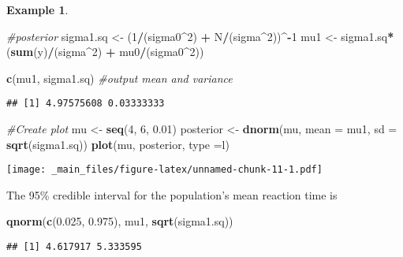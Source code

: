 \documentclass[
]{book}
\newenvironment{Shaded}{\begin{snugshade}}{\end{snugshade}}
\newcommand{\AttributeTok}[1]{\textcolor[rgb]{0.13,0.29,0.53}{#1}}
\newcommand{\CommentTok}[1]{\textcolor[rgb]{0.56,0.35,0.01}{\textit{#1}}}
\newcommand{\DecValTok}[1]{\textcolor[rgb]{0.00,0.00,0.81}{#1}}
\newcommand{\FloatTok}[1]{\textcolor[rgb]{0.00,0.00,0.81}{#1}}
\newcommand{\FunctionTok}[1]{\textcolor[rgb]{0.13,0.29,0.53}{\textbf{#1}}}
\newcommand{\NormalTok}[1]{#1}
\newcommand{\OtherTok}[1]{\textcolor[rgb]{0.56,0.35,0.01}{#1}}
\newcommand{\SpecialCharTok}[1]{\textcolor[rgb]{0.81,0.36,0.00}{\textbf{#1}}}
\newcommand{\StringTok}[1]{\textcolor[rgb]{0.31,0.60,0.02}{#1}}
\theoremstyle{definition}
\theoremstyle{definition}
\newtheorem{example}{Example}[chapter]
\theoremstyle{definition}
\theoremstyle{definition}
\theoremstyle{remark}
\begin{document}
\begin{example}
\begin{Shaded}
\begin{Highlighting}[]
\CommentTok{\#posterior}
\NormalTok{sigma1.sq }\OtherTok{\textless{}{-}}\NormalTok{ (}\DecValTok{1}\SpecialCharTok{/}\NormalTok{(sigma0}\SpecialCharTok{\^{}}\DecValTok{2}\NormalTok{)  }\SpecialCharTok{+}\NormalTok{ N}\SpecialCharTok{/}\NormalTok{(sigma}\SpecialCharTok{\^{}}\DecValTok{2}\NormalTok{))}\SpecialCharTok{\^{}{-}}\DecValTok{1}
\NormalTok{mu1       }\OtherTok{\textless{}{-}}\NormalTok{ sigma1.sq}\SpecialCharTok{*}\NormalTok{(}\FunctionTok{sum}\NormalTok{(y)}\SpecialCharTok{/}\NormalTok{(sigma}\SpecialCharTok{\^{}}\DecValTok{2}\NormalTok{) }\SpecialCharTok{+}\NormalTok{ mu0}\SpecialCharTok{/}\NormalTok{(sigma0}\SpecialCharTok{\^{}}\DecValTok{2}\NormalTok{))}

\FunctionTok{c}\NormalTok{(mu1, sigma1.sq) }\CommentTok{\#output mean and variance}
\end{Highlighting}
\end{Shaded}

\begin{verbatim}
## [1] 4.97575608 0.03333333
\end{verbatim}

\begin{Shaded}
\begin{Highlighting}[]
\CommentTok{\#Create plot}
\NormalTok{mu }\OtherTok{\textless{}{-}} \FunctionTok{seq}\NormalTok{(}\DecValTok{4}\NormalTok{, }\DecValTok{6}\NormalTok{, }\FloatTok{0.01}\NormalTok{)}
\NormalTok{posterior }\OtherTok{\textless{}{-}} \FunctionTok{dnorm}\NormalTok{(mu, }\AttributeTok{mean =}\NormalTok{ mu1, }\AttributeTok{sd =} \FunctionTok{sqrt}\NormalTok{(sigma1.sq))}
\FunctionTok{plot}\NormalTok{(mu, posterior, }\AttributeTok{type =}\StringTok{\textquotesingle{}l\textquotesingle{}}\NormalTok{)}
\end{Highlighting}
\end{Shaded}

\texttt{[image: \_main\_files/figure-latex/unnamed-chunk-11-1.pdf]}

The 95\% credible interval for the population's mean reaction time is

\begin{Shaded}
\begin{Highlighting}[]
\FunctionTok{qnorm}\NormalTok{(}\FunctionTok{c}\NormalTok{(}\FloatTok{0.025}\NormalTok{, }\FloatTok{0.975}\NormalTok{), mu1, }\FunctionTok{sqrt}\NormalTok{(sigma1.sq))}
\end{Highlighting}
\end{Shaded}

\begin{verbatim}
## [1] 4.617917 5.333595
\end{verbatim}

\end{example}
\end{document}
